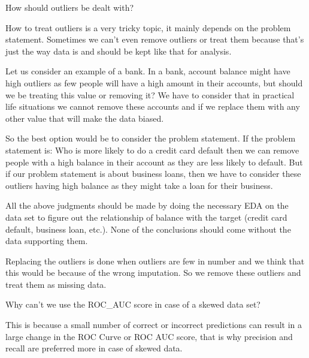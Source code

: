 	\begin{qanda}
		\begin{question}
How should outliers be dealt with?
		\end{question}
		\begin{answer}
How to treat outliers is a very tricky topic, it mainly depends on the problem statement. Sometimes we can't even remove outliers or treat them because that's just the way data is and should be kept like that for analysis.

Let us consider an example of a bank.  In a bank, account balance might have high outliers as few people will have a high amount in their accounts, but should we be treating this value or removing it?  We have to consider that in practical life situations we cannot remove these accounts and if we replace them with any other value that will make the data biased.

So the best option would be to consider the problem statement. If the problem statement is: Who is more likely to do a credit card default then we can remove people with a high balance in their account as they are less likely to default.  But if our problem statement is about business loans, then we have to consider these outliers having high balance as they might take a loan for their business.

All the above judgments should be made by doing the necessary EDA on the data set to figure out the relationship of balance with the target (credit card default, business loan, etc.).  None of the conclusions should come without the data supporting them.

Replacing the outliers is done when outliers are few in number and we think that this would be because of the wrong imputation. So we remove these outliers and treat them as missing data.
		\end{answer}
	\end{qanda}


	\begin{qanda}
		\begin{question}
Why can't we use the ROC\_AUC score in case of a skewed data set?%
		\end{question}
		\begin{answer}
This is because a small number of correct or incorrect predictions can result in a large change in the ROC Curve or ROC AUC score, that is why precision and recall are preferred more in case of skewed data.
		\end{answer}
	\end{qanda}

